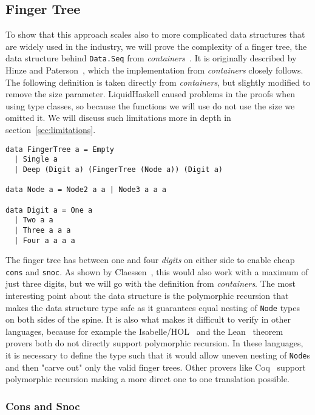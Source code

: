 \documentclass[sigplan,screen]{acmart}
\begin{document}
\subsection{Finger Tree}

To show that this approach scales also to more complicated data structures that are widely used in the industry, we will prove the complexity of a finger tree, the data structure behind \texttt{Data.Seq} from \textit{containers}~\cite{containers}. It is originally described by Hinze and Paterson~\cite{fingertrees}, which the implementation from \textit{containers} closely follows. The following definition is taken directly from \textit{containers}, but slightly modified to remove the size parameter. LiquidHaskell caused problems in the proofs when using type classes, so because the functions we will use do not use the size we omitted it. We will discuss such limitations more in depth in section~\ref{sec:limitations}.

\begin{lstlisting}
data FingerTree a = Empty
  | Single a
  | Deep (Digit a) (FingerTree (Node a)) (Digit a)

data Node a = Node2 a a | Node3 a a a

data Digit a = One a
  | Two a a
  | Three a a a
  | Four a a a a
\end{lstlisting}

The finger tree has between one and four \textit{digits} on either side to enable cheap \texttt{cons} and \texttt{snoc}. As shown by Claessen~\cite{fingertrees_new}, this would also work with a maximum of just three digits, but we will go with the definition from \textit{containers}. The most interesting point about the data structure is the polymorphic recursion that makes the data structure type safe as it guarantees equal nesting of \texttt{Node} types on both sides of the spine. It is also what makes it difficult to verify in other languages, because for example the Isabelle/HOL~\cite{isabelle} and the Lean~\cite{lean} theorem provers both do not directly support polymorphic recursion. In these languages, it is necessary to define the type such that it would allow uneven nesting of \texttt{Node}s and then "carve out" only the valid finger trees. Other provers like Coq~\cite{coq} support polymorphic recursion making a more direct one to one translation possible.

\subsubsection{Cons and Snoc}
\end{document}
